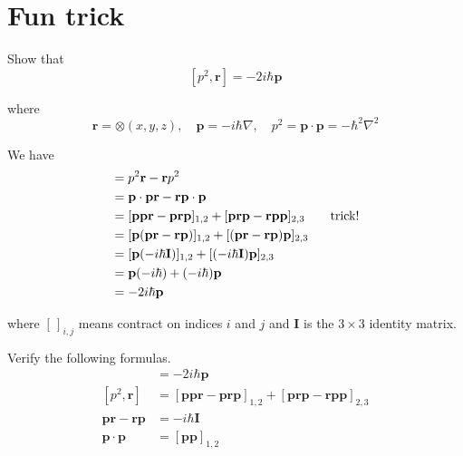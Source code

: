 

\section*{Fun trick}

Show that
\begin{equation*}
\left[p^2,\mathbf r\right]=-2i\hbar\mathbf p
\end{equation*}

where
\begin{equation*}
\mathbf r=\otimes(x,y,z),\quad
\mathbf p=-i\hbar\nabla,\quad
p^2=\mathbf p\cdot\mathbf p=-\hbar^2\nabla^2
\end{equation*}

We have
\begin{align*}
[p^2,\mathbf r]
&=p^2\mathbf r-\mathbf rp^2
\\
&=\mathbf p\cdot\mathbf p\mathbf r-\mathbf r \mathbf p\cdot\mathbf p
\\
&=[\mathbf p\mathbf p\mathbf r-\mathbf p\mathbf r\mathbf p]_{1,2}
+[\mathbf p\mathbf r\mathbf p-\mathbf r\mathbf p\mathbf p]_{2,3}
\tag*{\text{trick!}}
\\
&=[\mathbf p(\mathbf{pr}-\mathbf{rp})]_{1,2}+[(\mathbf{pr}-\mathbf{rp})\mathbf p]_{2,3}
\\
&=[\mathbf p(-i\hbar\mathbf I)]_{1,2}+[(-i\hbar\mathbf I)\mathbf p]_{2,3}
\\
&=\mathbf p(-i\hbar)+(-i\hbar)\mathbf p
\\
&=-2i\hbar\mathbf p
\end{align*}

where $[\,]_{i,j}$ means contract on indices $i$ and $j$ and
$\mathbf I$ is the $3\times3$ identity matrix.

\bigskip
Verify the following formulas.
\begin{align*}
[p^2,\mathbf r]
&=-2i\hbar\mathbf p
\tag{1}
\\[1ex]
[p^2,\mathbf r]
&=[\mathbf p\mathbf p\mathbf r-\mathbf p\mathbf r\mathbf p]_{1,2}
+[\mathbf p\mathbf r\mathbf p-\mathbf r\mathbf p\mathbf p]_{2,3}
\tag{2}
\\[1ex]
\mathbf p\mathbf r-\mathbf r\mathbf p&=-i\hbar\mathbf I
\tag{3}
\\[1ex]
\mathbf p\cdot\mathbf p&=[\mathbf p\mathbf p]_{1,2}
\tag{4}
\end{align*}


